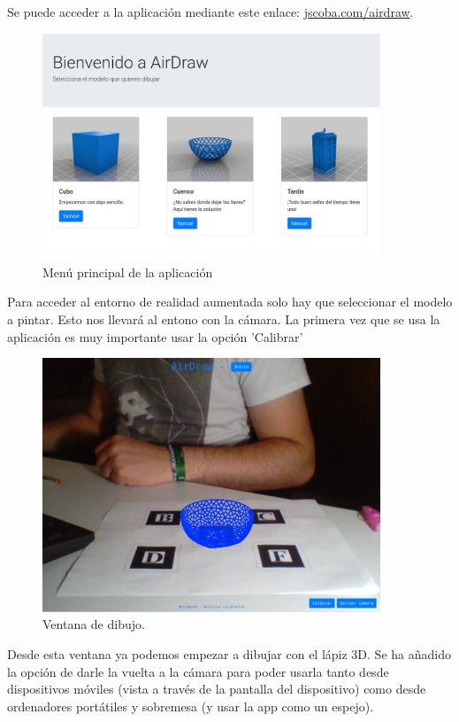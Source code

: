 \documentclass[12pt,a4paper]{article}
\begin{document}
Se puede acceder a la aplicación mediante este enlace: \href{https://jscoba.com/airdraw}{jscoba.com/airdraw}.
\begin{figure}[H]
    \centering
    \includegraphics[width=0.9\textwidth]{main_app.png}
    \caption{Menú principal de la aplicación}
\end{figure}

Para acceder al entorno de realidad aumentada solo hay que seleccionar el modelo a pintar. Esto nos llevará al entono con la cámara. La primera vez que se usa la aplicación es muy importante usar la opción 'Calibrar' 

\begin{figure}[H]
    \centering
    \includegraphics[width=0.9\textwidth]{ar_app.png}
    \caption{Ventana de dibujo.}
\end{figure}

Desde esta ventana ya podemos empezar a dibujar con el lápiz 3D. Se ha añadido la opción de darle la vuelta a la cámara para poder usarla tanto desde dispositivos móviles (vista a través de la pantalla del dispositivo) como desde ordenadores portátiles y sobremesa (y usar la app como un espejo).
\end{document}
